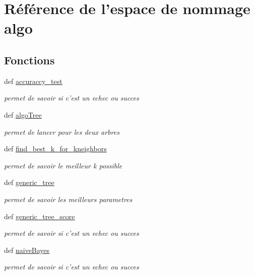 \hypertarget{namespacealgo}{\section{Référence de l'espace de nommage algo}
\label{namespacealgo}
}
\subsection*{Fonctions}
\begin{DoxyCompactItemize}
\item 
def \hyperlink{namespacealgo_a802d43423d0ac8fd6a52cc2508186072}{accuraccy\-\_\-test}
\begin{DoxyCompactList}\small\item\em permet de savoir si c'est un echec ou succes \end{DoxyCompactList}\item 
def \hyperlink{namespacealgo_ab46541a846c7f71c15e9bae5d5836af7}{algo\-Tree}
\begin{DoxyCompactList}\small\item\em permet de lancer pour les deux arbres \end{DoxyCompactList}\item 
def \hyperlink{namespacealgo_a70c4b2737389dbfb07be3b39a8cf8e9b}{find\-\_\-best\-\_\-k\-\_\-for\-\_\-kneighbors}
\begin{DoxyCompactList}\small\item\em permet de savoir le meilleur k possible \end{DoxyCompactList}\item 
def \hyperlink{namespacealgo_a4227080ec2328a03c4f6f01e7b022e08}{generic\-\_\-tree}
\begin{DoxyCompactList}\small\item\em permet de savoir les meilleurs parametres \end{DoxyCompactList}\item 
def \hyperlink{namespacealgo_a0afe8d007fc92279c75be5d0b40ecf07}{generic\-\_\-tree\-\_\-score}
\begin{DoxyCompactList}\small\item\em permet de savoir si c'est un echec ou succes \end{DoxyCompactList}\item 
def \hyperlink{namespacealgo_a5ecd48a13b42118beac0652265b8f353}{naive\-Bayes}
\begin{DoxyCompactList}\small\item\em permet de savoir si c'est un echec ou succes \end{DoxyCompactList}\end{DoxyCompactItemize}


